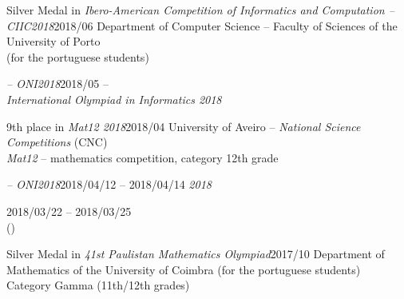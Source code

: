 \documentclass{cv}
\newif\ifen
\newif\ifpt
\newcommand{\en}[1]{\ifen#1\fi}
\newcommand{\pt}[1]{\ifpt#1\fi}
\begin{document}
\begin{jobopt}{Silver Medal in \textit{Ibero-American Competition of Informatics and Computation -- CIIC2018}}{2018/06}%
    Department of Computer Science -- Faculty of Sciences of the University of Porto \\(for the portuguese students)
\end{jobopt}
\begin{jobopt}{\en{7th place on the National Finals of} \textit{\en{National Informatics Olympiad} -- ONI2018}}{2018/05}%
    \en{Department of Computer Science} -- \en{Faculty of Sciences of the University of Porto}\\
    \en{Invited to participate in the preparation stage for the} \textit{International Olympiad in Informatics 2018}
\end{jobopt}
\begin{jobopt}{9th place in \textit{Mat12 2018}}{2018/04}%
    University of Aveiro -- \textit{National Science Competitions} (CNC) \\
    \textit{Mat12} -- mathematics competition, category 12th grade
\end{jobopt}
\begin{jobopt}{\en{3rd place in Qualification Phase of} \textit{\en{National Informatics Olympiad} -- ONI2018}}{2018/04/12 -- 2018/04/14}
    \en{Invited to participate in the National Finals of} \textit{\en{National Informatics Olympiad} 2018}
\end{jobopt}
\begin{jobopt}{\en{Participation in the National Finals of} \textit{\en{36th Portuguese Mathematics Olympiad}}}{2018/03/22 -- 2018/03/25}
    \en{Mirandela Schools Grouping}\\
    \en{Category B} (\en{10th-12th grades})
\end{jobopt}
\begin{jobopt}{Silver Medal in \textit{41st Paulistan Mathematics Olympiad}}{2017/10}%
    Department of Mathematics of the University of Coimbra (for the portuguese students)\\
    Category Gamma (11th/12th grades)
\end{jobopt}
\end{document}
